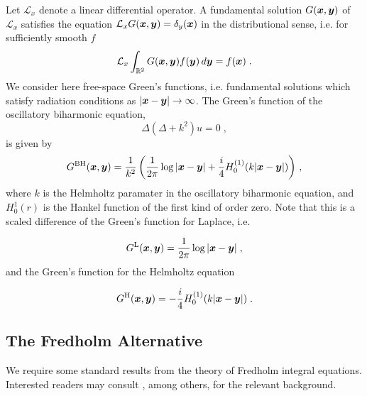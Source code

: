Let $\mathcal{L}_x$ denote a linear differential operator. A fundamental
solution $G({\boldsymbol x},{\boldsymbol y})$ of $\mathcal{L}_x$ satisfies the equation
$\mathcal{L}_x G({\boldsymbol x},{\boldsymbol y}) = \delta_y({\boldsymbol x})$ in the distributional sense, i.e.
for sufficiently smooth $f$
\begin{equation}
  \mathcal{L}_x \int_{\mathbb{R}^2} G({\boldsymbol x},{\boldsymbol y}) f({\boldsymbol y}) \, d {\boldsymbol y} = f({\boldsymbol x}) \; .
  \nonumber
\end{equation}
We consider here
free-space Green's functions, i.e. fundamental solutions which satisfy
radiation conditions as $|{\boldsymbol x}-{\boldsymbol y}| \to \infty$.
The Green's function of the oscillatory biharmonic equation,
\begin{equation}
  \Delta ( \Delta + k^2 ) u = 0 \; , \label{eq:obiharm} \nonumber
\end{equation}
is given by 
\begin{equation}
  G^{\textrm{BH}}({\boldsymbol x},{\boldsymbol y}) = \frac{1}{k^2}
  \left (\frac{1}{2\pi} \log |{\boldsymbol x}-{\boldsymbol y}| +
  \frac{i}{4} H_0^{(1)}(k|{\boldsymbol x}-{\boldsymbol y}|) \right ) \, ,
  \label{eq:Gbh}
\end{equation}
where $k$ is the Helmholtz paramater in the oscillatory biharmonic equation,
and $H_{0}^{1}(r)$ is the Hankel function of the first kind of order zero.
Note that this is a scaled difference of the Green's function for
Laplace, i.e.

\begin{equation}
  G^{\textrm{L}}({\boldsymbol x},{\boldsymbol y}) = \frac{1}{2\pi} \log |{\boldsymbol x}-{\boldsymbol y}| \; , \nonumber
\end{equation}
and the Green's function for the Helmholtz equation

\begin{equation}
  G^{\textrm{H}}({\boldsymbol x},{\boldsymbol y}) = -\frac{i}{4} H_0^{(1)}(k|{\boldsymbol x}-{\boldsymbol y}|) \; . \nonumber
\end{equation}

\subsection{The Fredholm Alternative}

We require some standard results from the theory of
Fredholm integral equations. Interested readers may
consult \cite{reed1972methods,colton1983integral,kress1989linear},
among others, for the relevant background.


